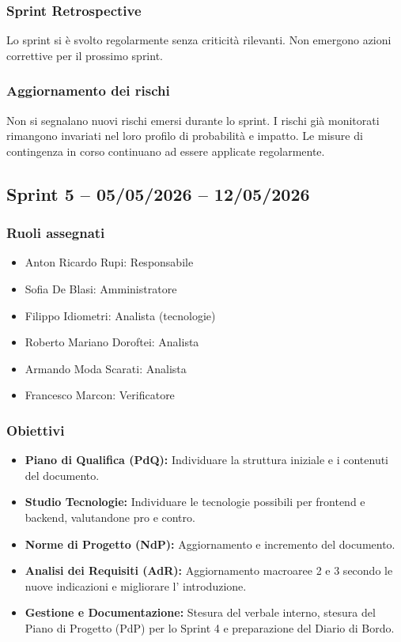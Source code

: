 \subsubsection{Sprint Retrospective}
Lo sprint si è svolto regolarmente senza criticità rilevanti. Non emergono azioni
correttive per il prossimo sprint.

\subsubsection{Aggiornamento dei rischi}
Non si segnalano nuovi rischi emersi durante lo sprint. I rischi già monitorati
rimangono invariati nel loro profilo di probabilità e impatto. Le misure di
contingenza in corso continuano ad essere applicate regolarmente.

\subsection{Sprint 5 -- 05/05/2026 -- 12/05/2026}
\label{sec:sprint5}

\subsubsection{Ruoli assegnati}
\begin{itemize}
    \item Anton Ricardo Rupi: Responsabile
    \item Sofia De Blasi: Amministratore
    \item Filippo Idiometri: Analista (tecnologie)
    \item Roberto Mariano Doroftei: Analista
    \item Armando Moda Scarati: Analista
    \item Francesco Marcon: Verificatore
\end{itemize}

\subsubsection{Obiettivi}

\begin{itemize}
    \item \textbf{Piano di Qualifica (PdQ):} Individuare la struttura iniziale e i contenuti del documento.
    \item \textbf{Studio Tecnologie:} Individuare le tecnologie possibili per frontend e backend, valutandone pro e contro.
    \item \textbf{Norme di Progetto (NdP):} Aggiornamento e incremento del documento.
    \item \textbf{Analisi dei Requisiti (AdR):} Aggiornamento macroaree 2 e 3 secondo le nuove indicazioni e migliorare l' introduzione.
    \item \textbf{Gestione e Documentazione:} Stesura del verbale interno, stesura del Piano di Progetto (PdP) per lo Sprint 4 e preparazione del Diario di Bordo.
\end{itemize}

